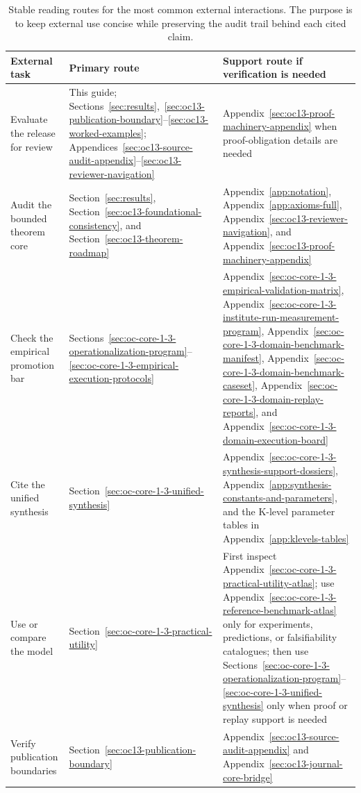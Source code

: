 \begin{table}[htbp]
\centering
\begingroup
\footnotesize
\RaggedRight
\setlength{\tabcolsep}{4pt}
\begin{tabular}{@{}L{0.23\textwidth}L{0.32\textwidth}L{0.31\textwidth}@{}}
\toprule
\textbf{External task} & \textbf{Primary route} & \textbf{Support route if verification is needed} \\
\midrule
Evaluate the release for review & This guide; Sections~\ref{sec:results},~\ref{sec:oc13-publication-boundary}--\ref{sec:oc13-worked-examples}; Appendices~\ref{sec:oc13-source-audit-appendix}--\ref{sec:oc13-reviewer-navigation} & Appendix~\ref{sec:oc13-proof-machinery-appendix} when proof-obligation details are needed \\
Audit the bounded theorem core & Section~\ref{sec:results}, Section~\ref{sec:oc13-foundational-consistency}, and Section~\ref{sec:oc13-theorem-roadmap} & Appendix~\ref{app:notation}, Appendix~\ref{app:axioms-full}, Appendix~\ref{sec:oc13-reviewer-navigation}, and Appendix~\ref{sec:oc13-proof-machinery-appendix} \\
Check the empirical promotion bar & Sections~\ref{sec:oc-core-1-3-operationalization-program}--\ref{sec:oc-core-1-3-empirical-execution-protocols} & Appendix~\ref{sec:oc-core-1-3-empirical-validation-matrix}, Appendix~\ref{sec:oc-core-1-3-institute-run-measurement-program}, Appendix~\ref{sec:oc-core-1-3-domain-benchmark-manifest}, Appendix~\ref{sec:oc-core-1-3-domain-benchmark-caseset}, Appendix~\ref{sec:oc-core-1-3-domain-replay-reports}, and Appendix~\ref{sec:oc-core-1-3-domain-execution-board} \\
Cite the unified synthesis & Section~\ref{sec:oc-core-1-3-unified-synthesis} & Appendix~\ref{sec:oc-core-1-3-synthesis-support-dossiers}, Appendix~\ref{app:synthesis-constants-and-parameters}, and the K-level parameter tables in Appendix~\ref{app:klevels-tables} \\
Use or compare the model & Section~\ref{sec:oc-core-1-3-practical-utility} & First inspect Appendix~\ref{sec:oc-core-1-3-practical-utility-atlas}; use Appendix~\ref{sec:oc-core-1-3-reference-benchmark-atlas} only for experiments, predictions, or falsifiability catalogues; then use Sections~\ref{sec:oc-core-1-3-operationalization-program}--\ref{sec:oc-core-1-3-unified-synthesis} only when proof or replay support is needed \\
Verify publication boundaries & Section~\ref{sec:oc13-publication-boundary} & Appendix~\ref{sec:oc13-source-audit-appendix} and Appendix~\ref{sec:oc13-journal-core-bridge} \\
\bottomrule
\end{tabular}
\endgroup
\caption{Stable reading routes for the most common external
interactions. The purpose is to keep external use concise while preserving the
audit trail behind each cited claim.}
\label{tab:oc13-external-crosswalk}
\end{table}

